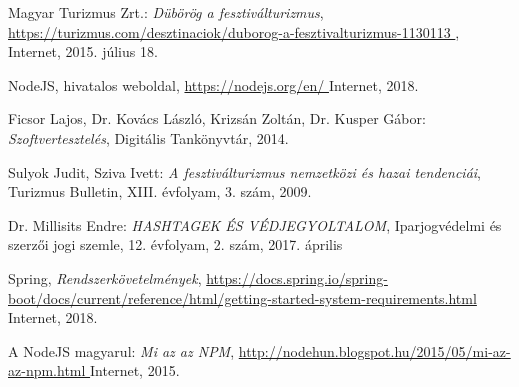 \begin{thebibliography}{x}
Magyar Turizmus Zrt.: \emph{Dübörög a fesztiválturizmus},
\url{ https://turizmus.com/desztinaciok/duborog-a-fesztivalturizmus-1130113 },
Internet, 2015. július 18.

NodeJS, hivatalos weboldal,
\url{ https://nodejs.org/en/ }
Internet, 2018.

Ficsor Lajos, Dr. Kovács László, Krizsán Zoltán, Dr. Kusper Gábor: \emph{Szoftvertesztelés}, Digitális Tankönyvtár, 2014.

Sulyok Judit, Sziva Ivett:
\emph{A fesztiválturizmus nemzetközi és hazai tendenciái},
Turizmus Bulletin, XIII. évfolyam, 3. szám, 2009.

Dr. Millisits Endre: \emph{HASHTAGEK ÉS VÉDJEGYOLTALOM}, Iparjogvédelmi és szerzői jogi szemle, 12. évfolyam, 2. szám, 2017. április

Spring, \emph{Rendszerkövetelmények},
\url{ https://docs.spring.io/spring-boot/docs/current/reference/html/getting-started-system-requirements.html }
Internet, 2018.

A NodeJS magyarul: \emph{Mi az az NPM},
\url{ http://nodehun.blogspot.hu/2015/05/mi-az-az-npm.html }
Internet, 2015.

\end{thebibliography}

